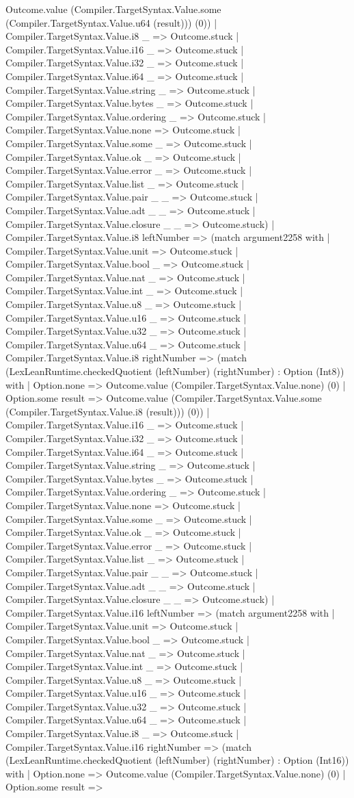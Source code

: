 \documentclass[11pt]{article}
\begin{document}
Outcome.value (Compiler.TargetSyntax.Value.some (Compiler.TargetSyntax.Value.u64 (result))) (0)) | Compiler.TargetSyntax.Value.i8 \_ => Outcome.stuck | Compiler.TargetSyntax.Value.i16 \_ => Outcome.stuck | Compiler.TargetSyntax.Value.i32 \_ => Outcome.stuck | Compiler.TargetSyntax.Value.i64 \_ => Outcome.stuck | Compiler.TargetSyntax.Value.string \_ => Outcome.stuck | Compiler.TargetSyntax.Value.bytes \_ => Outcome.stuck | Compiler.TargetSyntax.Value.ordering \_ => Outcome.stuck | Compiler.TargetSyntax.Value.none => Outcome.stuck | Compiler.TargetSyntax.Value.some \_ => Outcome.stuck | Compiler.TargetSyntax.Value.ok \_ => Outcome.stuck | Compiler.TargetSyntax.Value.error \_ => Outcome.stuck | Compiler.TargetSyntax.Value.list \_ => Outcome.stuck | Compiler.TargetSyntax.Value.pair \_ \_ => Outcome.stuck | Compiler.TargetSyntax.Value.adt \_ \_ => Outcome.stuck | Compiler.TargetSyntax.Value.closure \_ \_ => Outcome.stuck) | Compiler.TargetSyntax.Value.i8 leftNumber => (match argument2258 with | Compiler.TargetSyntax.Value.unit => Outcome.stuck | Compiler.TargetSyntax.Value.bool \_ => Outcome.stuck | Compiler.TargetSyntax.Value.nat \_ => Outcome.stuck | Compiler.TargetSyntax.Value.int \_ => Outcome.stuck | Compiler.TargetSyntax.Value.u8 \_ => Outcome.stuck | Compiler.TargetSyntax.Value.u16 \_ => Outcome.stuck | Compiler.TargetSyntax.Value.u32 \_ => Outcome.stuck | Compiler.TargetSyntax.Value.u64 \_ => Outcome.stuck | Compiler.TargetSyntax.Value.i8 rightNumber => (match (LexLeanRuntime.checkedQuotient (leftNumber) (rightNumber) : Option (Int8)) with | Option.none => Outcome.value (Compiler.TargetSyntax.Value.none) (0) | Option.some result => Outcome.value (Compiler.TargetSyntax.Value.some (Compiler.TargetSyntax.Value.i8 (result))) (0)) | Compiler.TargetSyntax.Value.i16 \_ => Outcome.stuck | Compiler.TargetSyntax.Value.i32 \_ => Outcome.stuck | Compiler.TargetSyntax.Value.i64 \_ => Outcome.stuck | Compiler.TargetSyntax.Value.string \_ => Outcome.stuck | Compiler.TargetSyntax.Value.bytes \_ => Outcome.stuck | Compiler.TargetSyntax.Value.ordering \_ => Outcome.stuck | Compiler.TargetSyntax.Value.none => Outcome.stuck | Compiler.TargetSyntax.Value.some \_ => Outcome.stuck | Compiler.TargetSyntax.Value.ok \_ => Outcome.stuck | Compiler.TargetSyntax.Value.error \_ => Outcome.stuck | Compiler.TargetSyntax.Value.list \_ => Outcome.stuck | Compiler.TargetSyntax.Value.pair \_ \_ => Outcome.stuck | Compiler.TargetSyntax.Value.adt \_ \_ => Outcome.stuck | Compiler.TargetSyntax.Value.closure \_ \_ => Outcome.stuck) | Compiler.TargetSyntax.Value.i16 leftNumber => (match argument2258 with | Compiler.TargetSyntax.Value.unit => Outcome.stuck | Compiler.TargetSyntax.Value.bool \_ => Outcome.stuck | Compiler.TargetSyntax.Value.nat \_ => Outcome.stuck | Compiler.TargetSyntax.Value.int \_ => Outcome.stuck | Compiler.TargetSyntax.Value.u8 \_ => Outcome.stuck | Compiler.TargetSyntax.Value.u16 \_ => Outcome.stuck | Compiler.TargetSyntax.Value.u32 \_ => Outcome.stuck | Compiler.TargetSyntax.Value.u64 \_ => Outcome.stuck | Compiler.TargetSyntax.Value.i8 \_ => Outcome.stuck | Compiler.TargetSyntax.Value.i16 rightNumber => (match (LexLeanRuntime.checkedQuotient (leftNumber) (rightNumber) : Option (Int16)) with | Option.none => Outcome.value (Compiler.TargetSyntax.Value.none) (0) | Option.some result => 
\end{document}

